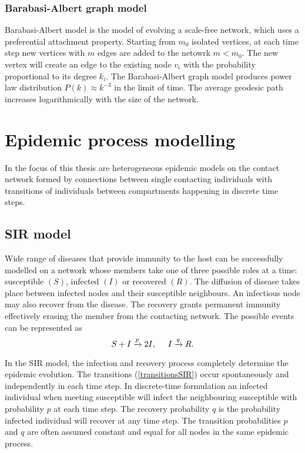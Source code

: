\documentclass[times, utf8, diplomski]{fer}
\begin{document}
\subsection{Barabasi-Albert graph model}
Barabasi-Albert model is the model of evolving a scale-free network, which uses a preferential attachment \cite{Dorogovtsev-2000} property. Starting from $m_0$ isolated vertices, at each time step new vertices with $m$ edges are added to the netowrk $m < m_0$. The new vertex will create an edge to the existing node $v_i$  with the probability proportional to its degree $k_i$. The Barabasi-Albert graph model produces power law distribution $P(k) \approx k ^{-3}$  in the limit of time. The average geodesic path  increases logarithmically with the size of the network.

\chapter{Epidemic process modelling}
\label{EPM}
In the focus of this thesis are heterogeneous epidemic models on the contact network formed by connections between single contacting individuals with transitions of individuals between compartments happening in discrete time steps.

\section{SIR model}
Wide range of diseases that provide immunity to the host can be successfully modelled on a network whose members take 	one of three possible roles at a time: susceptible $(S)$, infected $(I)$ or recovered $(R)$. The diffusion of disease takes place between infected nodes and their susceptible neighbours. An infectious node may also recover from the disease. The recovery grants permanent immunity effectively erasing the member from the contacting network.  The possible events can be represented as 
\begin{equation}
S + I \xrightarrow{p} 2I,\hspace{5mm}  I \xrightarrow{q} R.
\label{transitionsSIR}
\end{equation}

In the SIR model, the infection and recovery process completely determine the epidemic evolution. The transitions (\ref{transitionsSIR}) occur spontaneously and independently in each time step. In discrete-time formulation an infected individual when meeting susceptible will infect the neighbouring susceptible with probability $p$ at each time step. The recovery probability $q$ is the probability infected individual will recover at any time step. The transition probabilities $p$ and $q$ are often assumed constant and equal for all nodes in the same epidemic process. 
\end{document}

